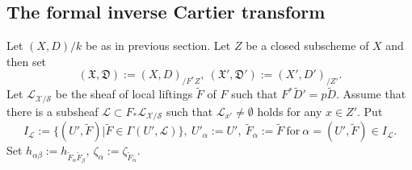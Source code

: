 \documentclass[12pt, a4paper]{article}
\begin{document}
\subsection{The formal inverse Cartier transform}
Let $(X,D)/k$ be as in previous section.  Let $Z$ be a closed subscheme of $X$ and then set
$$(\mathfrak X,\mathfrak D):=(X,D)_{/F^*Z},~(\mathfrak X',\mathfrak D'):=(X',D')_{/Z'}.$$
Let $\mathcal L_{\mathcal X/\mathcal S}$ be the sheaf of local liftings $\tilde F$ of $F$  such that $F^*\tilde D'=p\tilde D$. Assume that there is a subsheaf $\mathcal L\subset F_*\mathcal L_{\mathcal X/\mathcal S}$ such that $\mathcal L_{x'}\neq\emptyset$ holds for any $x\in Z'$.  Put 
$$I_{\mathcal L}:=\{(U',\tilde F)|\tilde F\in\Gamma(U',\mathcal L)\},~U'_\alpha:= U',~\tilde F_\alpha:=\tilde F~\mathrm{for}~\alpha=( U',\tilde F)\in I_\mathcal{L}.$$ 
Set $h_{\alpha\beta}:=h_{\tilde F_\alpha\tilde F_\beta},~\zeta_\alpha:=\zeta_{\tilde F_\alpha}.$

\end{document}
